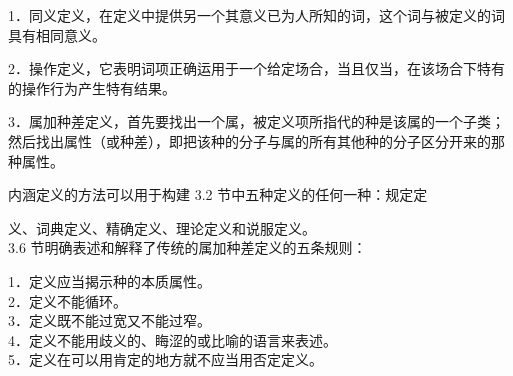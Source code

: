 1．同义定义，在定义中提供另一个其意义已为人所知的词，这个词与被定义的词具有相同意义。

2．操作定义，它表明词项正确运用于一个给定场合，当且仅当，在该场合下特有的操作行为产生特有结果。

3．属加种差定义，首先要找出一个属，被定义项所指代的种是该属的一个子类；然后找出属性（或种差），即把该种的分子与属的所有其他种的分子区分开来的那种属性。

内涵定义的方法可以用于构建 3.2 节中五种定义的任何一种：规定定

义、词典定义、精确定义、理论定义和说服定义。\\
3.6 节明确表述和解释了传统的属加种差定义的五条规则：

1．定义应当揭示种的本质属性。\\
2．定义不能循环。\\
3．定义既不能过宽又不能过窄。\\
4．定义不能用歧义的、䀲涩的或比喻的语言来表述。\\
5．定义在可以用肯定的地方就不应当用否定定义。

